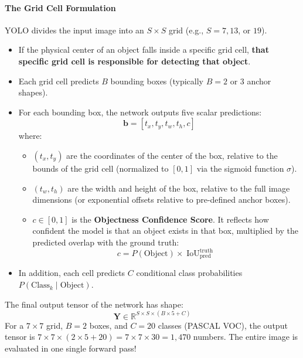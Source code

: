 \paragraph{The Grid Cell Formulation}
YOLO divides the input image into an $S \times S$ grid (e.g., $S = 7, 13$, or $19$).
\begin{itemize}
    \item If the physical center of an object falls inside a specific grid cell, \textbf{that specific grid cell is responsible for detecting that object}.
    \item Each grid cell predicts $B$ bounding boxes (typically $B = 2$ or $3$ anchor shapes).
    \item For each bounding box, the network outputs five scalar predictions:
    \begin{equation}
    \mathbf{b} = [t_x, t_y, t_w, t_h, c]\label{eq:yolo_box_tuple}
    \end{equation}
    where:
    \begin{itemize}
        \item $(t_x, t_y)$ are the coordinates of the center of the box, relative to the bounds of the grid cell (normalized to $[0, 1]$ via the sigmoid function $\sigma$).
        \item $(t_w, t_h)$ are the width and height of the box, relative to the full image dimensions (or exponential offsets relative to pre-defined anchor boxes).
        \item $c \in [0, 1]$ is the \textbf{Objectness Confidence Score}. It reflects how confident the model is that an object exists in that box, multiplied by the predicted overlap with the ground truth:
        \begin{equation}
        c = P(\text{Object}) \times \operatorname{IoU}_{\text{pred}}^{\text{truth}}\label{eq:objectness}
        \end{equation}
    \end{itemize}
    \item In addition, each cell predicts $C$ conditional class probabilities $P(\text{Class}_k \mid \text{Object})$.
\end{itemize}

The final output tensor of the network has shape:
\begin{equation}
\mathbf{Y} \in \mathbb{R}^{S \times S \times (B \times 5 + C)}\label{eq:yolo_tensor_shape}
\end{equation}
For a $7 \times 7$ grid, $B = 2$ boxes, and $C = 20$ classes (PASCAL VOC), the output tensor is $7 \times 7 \times (2 \times 5 + 20) = 7 \times 7 \times 30 = 1{,}470$ numbers. The entire image is evaluated in one single forward pass!

